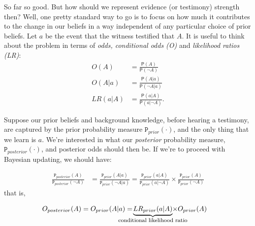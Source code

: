 \documentclass[10pt,dvipsnames,enabledeprecatedfontcommands]{scrartcl}
\newcommand{\n}{\neg}
\newcommand{\pr}[1]{\mathsf{P}(#1)}
\newcommand{\prr}[1]{\mbox{$\mathtt{P}_{prior}(#1)$}}
\newcommand{\prp}[1]{\mbox{$\mathtt{P}_{posterior}(#1)$}}
\begin{document}
So far so good. But how should we represent evidence (or testimony)
strength then? Well, one pretty standard way to go is to focus on how
much it contributes to the change in our beliefs in a way independent of
any particular choice of prior beliefs. Let \(a\) be the event that the
witness testified that \(A\). It is useful to think about the problem in
terms of \emph{odds, conditional odds (O)} and
\emph{likelihood ratios (LR)}:
\begin{align*} O(A)  & = \frac{\pr{A}}{\pr{\n A}}\\
 O(A\vert a) &= \frac{\pr{A\vert a}}{\pr{\n A \vert a}}  \\
 LR(a\vert A) &= \frac{\pr{a\vert A}}{\pr{a\vert \n A}}. 
\end{align*}

Suppose our prior beliefs and background knowledge, before hearing a
testimony, are captured by the prior probability measure
\(\prr{\cdot}\), and the only thing that we learn is \(a\). We're
interested in what our \emph{posterior} probability measure,
\(\prp{\cdot}\), and posterior odds should then be. If we're to proceed
with Bayesian updating, we should have:

\vspace{-6mm}

\begin{align*}
 \frac{\prp{A}}{\prp{\n A}} & = \frac{\prr{A\vert a}}{\prr{\n A\vert a}}
 =
 \frac{\prr{a\vert A}}{\prr{a\vert \n A}}
 \times
 \frac{\prr{A}}{\prr{\n A}}
  \end{align*} that is,

\vspace{-6mm}

\begin{align}
 \label{bayesodss2}
 O_{posterior}(A)& = O_{prior}(A\vert a) = \!\!\!\!\!  \!\!\!\!\!  \!\! \!\!  \underbrace{LR_{prior}(a\vert A)}_{\mbox{\footnotesize conditional likelihood ratio}}  \!\!\!\!\!   \!\!\!\!\!  \!\! \!\!   \times  O_{prior}(A)
 \end{align}
\end{document}
